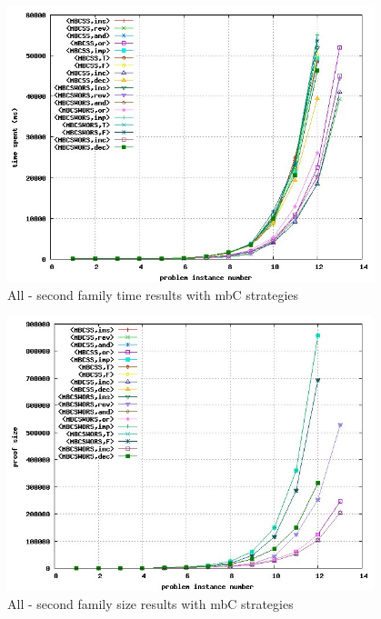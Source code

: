 \documentclass[a4paper,10pt]{book}
\newcommand{\mbc}{mbC}
\begin{document}

\begin{figure}[!htbp]
\begin{center}
\includegraphics[width=0.95\textwidth]{../mbc_2_a.jpg}
\end{center}
\caption{All - second family time results with \mbc\/ strategies}
\end{figure}


\begin{figure}[!htbp]
\begin{center}
\includegraphics[width=0.95\textwidth]{../mbc_2_b.jpg}
\end{center}
\caption{All - second family size results with \mbc\/ strategies}
\end{figure}
\end{document}
